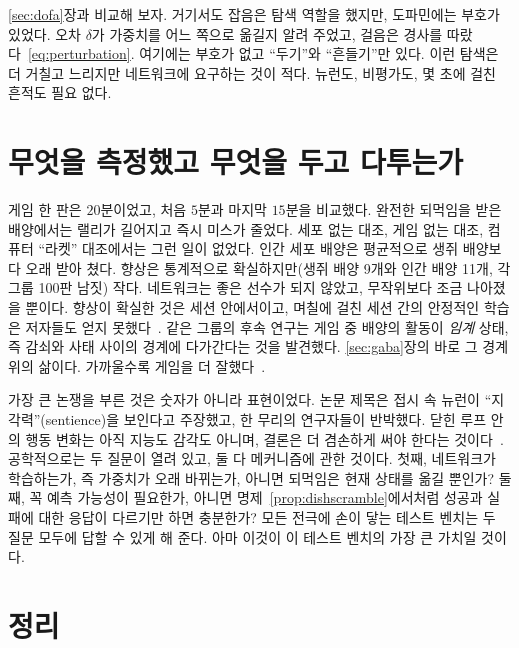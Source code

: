 \ref{sec:dofa}장과 비교해 보자. 거기서도 잡음은 탐색 역할을 했지만, 도파민에는 부호가 있었다. 오차 $\delta$가 가중치를 어느 쪽으로 옮길지 알려 주었고, 걸음은 경사를 따랐다~\eqref{eq:perturbation}. 여기에는 부호가 없고 “두기”와 “흔들기”만 있다. 이런 탐색은 더 거칠고 느리지만 네트워크에 요구하는 것이 적다.  뉴런도, 비평가도, 몇 초에 걸친 흔적도 필요 없다.

\section{무엇을 측정했고 무엇을 두고 다투는가}

게임 한 판은 $20$분이었고, 처음 $5$분과 마지막 $15$분을 비교했다. 완전한 되먹임을 받은 배양에서는 랠리가 길어지고 즉시 미스가 줄었다. 세포 없는 대조, 게임 없는 대조, 컴퓨터 “라켓” 대조에서는 그런 일이 없었다. 인간 세포 배양은 평균적으로 생쥐 배양보다 오래 받아 쳤다. 향상은 통계적으로 확실하지만(생쥐 배양 9개와 인간 배양 11개, 각 그룹 100판 남짓) 작다. 네트워크는 좋은 선수가 되지 않았고, 무작위보다 조금 나아졌을 뿐이다. 향상이 확실한 것은 세션 안에서이고, 며칠에 걸친 세션 간의 안정적인 학습은 저자들도 얻지 못했다~\cite{Kagan2022}. 같은 그룹의 후속 연구는 게임 중 배양의 활동이 \emph{임계} 상태, 즉 감쇠와 사태 사이의 경계에 다가간다는 것을 발견했다. \ref{sec:gaba}장의 바로 그 경계 위의 삶이다. 가까울수록 게임을 더 잘했다~\cite{Habibollahi2023}.

가장 큰 논쟁을 부른 것은 숫자가 아니라 표현이었다. 논문 제목은 접시 속 뉴런이 “지각력”(sentience)을 보인다고 주장했고, 한 무리의 연구자들이 반박했다. 닫힌 루프 안의 행동 변화는 아직 지능도 감각도 아니며, 결론은 더 겸손하게 써야 한다는 것이다~\cite{Balci2023}. 공학적으로는 두 질문이 열려 있고, 둘 다 메커니즘에 관한 것이다. 첫째, 네트워크가 학습하는가, 즉 가중치가 오래 바뀌는가, 아니면 되먹임은 현재 상태를 옮길 뿐인가? 둘째, 꼭 예측 가능성이 필요한가, 아니면 명제~\ref{prop:dishscramble}에서처럼 성공과 실패에 대한 응답이 다르기만 하면 충분한가? 모든 전극에 손이 닿는 테스트 벤치는 두 질문 모두에 답할 수 있게 해 준다. 아마 이것이 이 테스트 벤치의 가장 큰 가치일 것이다.



\section{정리}

